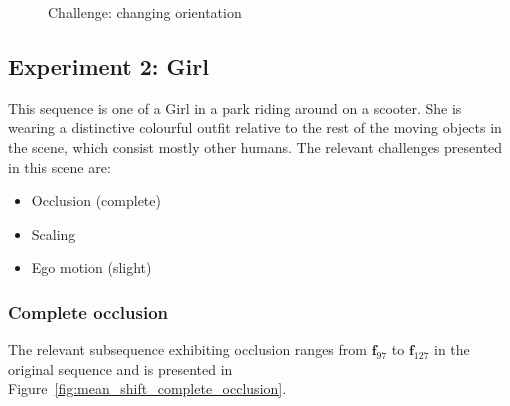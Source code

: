 \begin{figure}
{\begin{tabular}{cccc}
        \end{tabular}}
    \caption{Challenge: changing orientation\label{fig:mean_shift_orientation}
 }
\end{figure}

\subsection{Experiment 2: Girl}
This sequence is one of a Girl in a park riding around on a scooter. She is
wearing a distinctive colourful outfit relative to the rest of the moving objects in the
scene, which consist mostly other humans.
The relevant challenges presented in this scene are:
\begin{itemize}
    \item Occlusion (complete)
    \item Scaling 
    \item Ego motion (slight) 
\end{itemize}

\subsubsection{Complete occlusion}
The relevant subsequence exhibiting occlusion ranges from $\mathbf{f}_{97}$ to
$\mathbf{f}_{127}$ in the original sequence and is presented in Figure~\ref{fig:mean_shift_complete_occlusion}.

